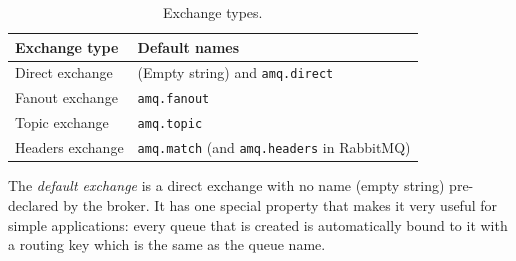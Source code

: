 \begin{table}
	\centering
	\begin{tabular}{l l}
		\toprule
		\textbf{Exchange type} & \textbf{Default names}                                    \\
		\midrule
		Direct exchange        & (Empty string) and \texttt{amq.direct}                    \\
		Fanout exchange        & \texttt{amq.fanout}                                       \\
		Topic exchange         & \texttt{amq.topic}                                        \\
		Headers exchange       & \texttt{amq.match} (and \texttt{amq.headers} in RabbitMQ) \\
		\bottomrule
	\end{tabular}
	\caption{Exchange types.}
	\label{tab:exchange-types}
\end{table}

The \emph{default exchange} is a direct exchange with no name (empty string) pre-declared by the broker. It has one special property that makes it
very useful for simple applications: every queue that is created is automatically bound to it with a routing key which is the same as the queue name.

